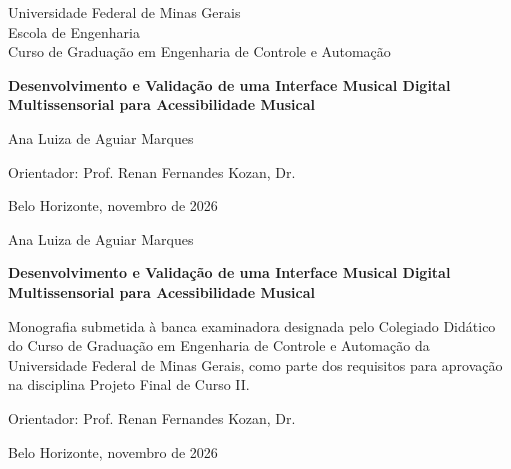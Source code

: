 \begin{titlepage}
\begin{center}

{\large Universidade Federal de Minas Gerais\\
Escola de Engenharia\\
Curso de Graduação em Engenharia de Controle e Automação}

\vspace{6cm}

{\bfseries\Large
Desenvolvimento e Validação de uma Interface Musical Digital\\
Multissensorial para Acessibilidade Musical}

\vspace{4cm}

{\large Ana Luiza de Aguiar Marques}

\vspace{3cm}

{\large Orientador: Prof. Renan Fernandes Kozan, Dr.}

\vfill

{\large Belo Horizonte, novembro de 2026}

\end{center}
\end{titlepage}

\clearpage
\setcounter{page}{1}
\thispagestyle{empty}

\begin{titlepage}

\begin{center}
{\large Ana Luiza de Aguiar Marques}

\vspace{3cm}

{\bfseries\Large
Desenvolvimento e Validação de uma Interface Musical Digital\\
Multissensorial para Acessibilidade Musical}
\end{center}

\vspace{4cm}

\hfill
\begin{minipage}{0.62\textwidth}
Monografia submetida à banca examinadora designada pelo Colegiado Didático do Curso de Graduação em Engenharia de Controle e Automação da Universidade Federal de Minas Gerais, como parte dos requisitos para aprovação na disciplina Projeto Final de Curso II.

\vspace{0.7cm}

Orientador: Prof. Renan Fernandes Kozan, Dr.
\end{minipage}

\vfill

\begin{center}
Belo Horizonte, novembro de 2026
\end{center}

\end{titlepage}

\clearpage
